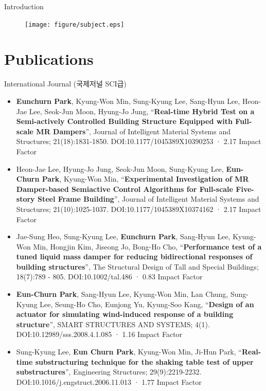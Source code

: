 \documentclass[usepdftitle=false]{beamer}
\newcommand\Fontvi{\fontsize{6}{7.2}\selectfont}
\begin{document}
\begin{frame}{Introduction}
\begin{figure}[ht]
\centering
\texttt{[image: figure/subject.eps]}
\label{fig:subject}
\end{figure}
\end{frame}




\section{Publications}

\begin{frame}{International Journal (국제저널 SCI급)}
\Fontvi
\begin{itemize}
\item \textbf{Eunchurn Park}, Kyung-Won Min, Sung-Kyung Lee, Sang-Hyun Lee, Heon-Jae Lee, Seok-Jun Moon, Hyung-Jo Jung, “\textbf{Real-time Hybrid Test on a Semi-actively Controlled Building Structure Equipped with Full-scale MR Dampers}”, Journal of Intelligent Material Systems and Structures; 21(18):1831-1850. DOI:10.1177/1045389X10390253 · 2.17 Impact Factor
\item Heon-Jae Lee, Hyung-Jo Jung, Seok-Jun Moon, Sung-Kyung Lee, \textbf{Eun-Churn Park}, Kyung-Won Min, “\textbf{Experimental Investigation of MR Damper-based Semiactive Control Algorithms for Full-scale Five-story Steel Frame Building}”, Journal of Intelligent Material Systems and Structures; 21(10):1025-1037. DOI:10.1177/1045389X10374162 · 2.17 Impact Factor
\item Jae-Sung Heo, Sung-Kyung Lee, \textbf{Eunchurn Park}, Sang-Hyun Lee, Kyung-Won Min, Hongjin Kim, Jiseong Jo, Bong-Ho Cho, “\textbf{Performance test of a tuned liquid mass damper for reducing bidirectional responses of building structures}”, The Structural Design of Tall and Special Buildings; 18(7):789 - 805. DOI:10.1002/tal.486 · 0.83 Impact Factor
\item \textbf{Eun-Churn Park}, Sang-Hyun Lee, Kyung-Won Min, Lan Chung, Sung-Kyung Lee, Seung-Ho Cho, Eunjong Yu, Kyung-Soo Kang, “\textbf{Design of an actuator for simulating wind-induced response of a building structure}”, SMART STRUCTURES AND SYSTEMS; 4(1). DOI:10.12989/sss.2008.4.1.085 · 1.16 Impact Factor
\item Sung-Kyung Lee, \textbf{Eun Churn Park}, Kyung-Won Min, Ji-Hun Park, “\textbf{Real-time substructuring technique for the shaking table test of upper substructures}”, Engineering Structures; 29(9):2219-2232. DOI:10.1016/j.engstruct.2006.11.013 · 1.77 Impact Factor

\end{itemize}
\end{frame}
\end{document}
